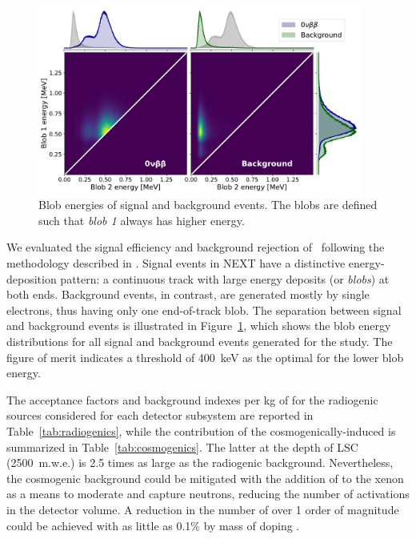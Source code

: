 \begin{figure}
\centering
\includegraphics[width=0.95\textwidth]{img/BlobComparison.pdf}
\caption{Blob energies of signal and background events. The blobs are defined such that \emph{blob 1} always has higher energy.}
\label{fig:blobs}
\end{figure}

We evaluated the signal efficiency and background rejection of \NHD\ following the methodology described in \cite{Martin-Albo:2015rhw, NEXT:2020amj}. Signal events in NEXT have a distinctive energy-deposition pattern: a continuous track with large energy deposits (or \emph{blobs}) at both ends. Background events, in contrast, are generated mostly by single electrons, thus having only one end-of-track blob. The separation between signal and background events is illustrated in Figure~\ref{fig:blobs}, which shows the blob energy distributions for all signal and background events generated for the study. The figure of merit indicates a threshold of \SI{400}{\kilo\eV} as the optimal for the lower blob energy.

The acceptance factors and background indexes per kg of  for the radiogenic sources considered for each detector subsystem are reported in Table~\ref{tab:radiogenics}, while the contribution of the cosmogenically-induced  is summarized in Table~\ref{tab:cosmogenics}. The latter at the depth of LSC (2500~m.w.e.) is 2.5 times as large as the radiogenic background. Nevertheless, the cosmogenic background could be mitigated with the addition of  to the xenon as a means to moderate and capture neutrons, reducing the number of activations in the detector volume. A reduction in the number  of over 1 order of magnitude could be achieved with as little as 0.1\% by mass of  doping \cite{rogers2020mitigation}.

